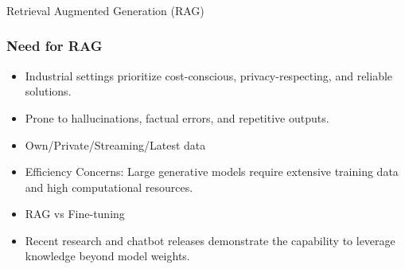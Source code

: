 \begin{frame}[fragile]\frametitle{}
\begin{center}
{\Large Retrieval Augmented Generation (RAG)}
\end{center}
\end{frame}





\begin{frame}[fragile]\frametitle{Need for RAG}

\begin{itemize}
\item Industrial settings prioritize cost-conscious, privacy-respecting, and reliable solutions.
\item Prone to hallucinations, factual errors, and repetitive outputs.
\item Own/Private/Streaming/Latest data
\item Efficiency Concerns: Large generative models require extensive training data and high computational resources.
\item RAG vs Fine-tuning
\item Recent research and chatbot releases demonstrate the capability to leverage knowledge beyond model weights.
\end{itemize}	

\end{frame}


